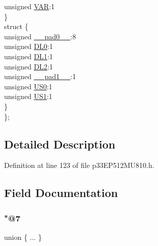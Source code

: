 \begin{DoxyCompactItemize}
\begin{tabbing}
\>\>unsigned \hyperlink{structtag_c_o_r_c_o_n_b_i_t_s_a8d1bf34c8ccd632757eb7f9a46156262}{VAR}:1\\
\>\} \\
\>struct \{\\
\>\>unsigned \hyperlink{structtag_c_o_r_c_o_n_b_i_t_s_adf71f3d8410c1f1dbbc96680a92c49af}{\_\_pad0\_\_}:8\\
\>\>unsigned \hyperlink{structtag_c_o_r_c_o_n_b_i_t_s_a5531fa563b12efda3e0e577ad86b45cd}{DL0}:1\\
\>\>unsigned \hyperlink{structtag_c_o_r_c_o_n_b_i_t_s_acfd09acf8a1d3558c1601427136ae18d}{DL1}:1\\
\>\>unsigned \hyperlink{structtag_c_o_r_c_o_n_b_i_t_s_a713ce977e0be4591fa73ebd12fc680b7}{DL2}:1\\
\>\>unsigned \hyperlink{structtag_c_o_r_c_o_n_b_i_t_s_acaf2d0924a107ec6e8d2e31febaf66f9}{\_\_pad1\_\_}:1\\
\>\>unsigned \hyperlink{structtag_c_o_r_c_o_n_b_i_t_s_a560f44f362ad8517d213d81648891084}{US0}:1\\
\>\>unsigned \hyperlink{structtag_c_o_r_c_o_n_b_i_t_s_a2b7b48c1b135c48b80b9297a6e05df57}{US1}:1\\
\>\} \\
\}; \\

\end{tabbing}\end{DoxyCompactItemize}


\subsection{Detailed Description}


Definition at line 123 of file p33\+E\+P512\+M\+U810.\+h.



\subsection{Field Documentation}
\mbox{\label{structtag_c_o_r_c_o_n_b_i_t_s_ad9bddbb42ef25e9dd916de5ac937818f}} 
\subsubsection{\texorpdfstring{"@7}{@7}}
{\footnotesize\ttfamily union \{ ... \} }

\mbox{\label{structtag_c_o_r_c_o_n_b_i_t_s_adf71f3d8410c1f1dbbc96680a92c49af}} 
